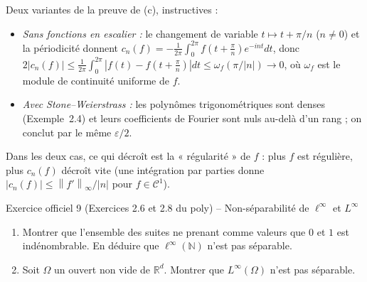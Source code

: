 \documentclass[11pt,a4paper]{article}
\newcommand{\R}{\mathbb{R}}
\newcommand{\N}{\mathbb{N}}
\newcommand{\norm}[1]{\left\|#1\right\|}
\theoremstyle{definition}
\begin{document}
\begin{commentaire}
Deux variantes de la preuve de (c), instructives :
\begin{itemize}
  \item \emph{Sans fonctions en escalier :} le changement de variable $t\mapsto t+\pi/n$ ($n\ne0$) et la périodicité donnent $c_n(f)=-\frac1{2\pi}\int_0^{2\pi}f(t+\frac\pi n)e^{-int}dt$, donc $2|c_n(f)|\le\frac1{2\pi}\int_0^{2\pi}|f(t)-f(t+\frac\pi n)|dt\le\omega_f(\pi/|n|)\to0$, où $\omega_f$ est le module de continuité uniforme de $f$.
  \item \emph{Avec Stone--Weierstrass :} les polynômes trigonométriques sont denses (Exemple~2.4) et leurs coefficients de Fourier sont nuls au-delà d'un rang ; on conclut par le même $\varepsilon/2$.
\end{itemize}
Dans les deux cas, ce qui décroît est la « régularité » de $f$ : plus $f$ est régulière, plus $c_n(f)$ décroît vite (une intégration par parties donne $|c_n(f)|\le\norm{f'}_\infty/|n|$ pour $f\in\mathcal C^1$).
\end{commentaire}

\begin{exo}{Exercice officiel 9 (Exercices 2.6 et 2.8 du poly) -- Non-séparabilité de $\ell^\infty$ et $L^\infty$}
\begin{enumerate}[label=(\alph*)]
  \item Montrer que l'ensemble des suites ne prenant comme valeurs que $0$ et $1$ est indénombrable. En déduire que $\ell^\infty(\N)$ n'est pas séparable.
  \item Soit $\Omega$ un ouvert non vide de $\R^d$. Montrer que $L^\infty(\Omega)$ n'est pas séparable.
\end{enumerate}
\end{exo}
\end{document}
